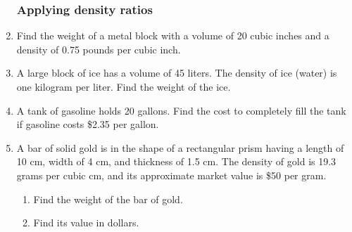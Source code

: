 \begin{enumerate}
\subsubsection*{Applying density ratios}
\item Find the weight of a metal block with a volume of 20 cubic inches and a density of 0.75 pounds per cubic inch. \vspace{3cm}
\item A large block of ice has a volume of 45 liters. The density of ice (water) is one kilogram per liter. Find the weight of the ice.  \vspace{3cm}
\item A tank of gasoline holds 20 gallons. Find the cost to completely fill the tank if gasoline costs \$2.35 per gallon. \vspace{3cm}
\item A bar of solid gold is in the shape of a rectangular prism having a length of 10 cm, width of 4 cm, and thickness of 1.5 cm. The density of gold is 19.3 grams per cubic cm, and its approximate market value is \$50 per gram.
\begin{enumerate}
  \item Find the weight of the bar of gold.  \vspace{3cm}
  \item Find its value in dollars.
\end{enumerate}


\end{enumerate}
